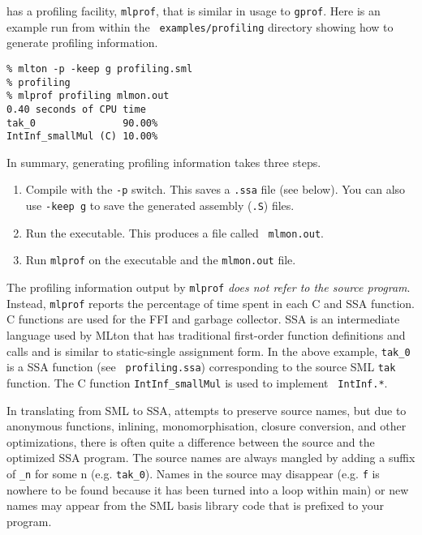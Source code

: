 
{\mlton} has a profiling facility, {\tt mlprof}, that is similar in
usage to {\tt gprof}.  Here is an example run from within the {\tt
  examples/profiling} directory showing how to generate profiling
information.

\begin{verbatim}
% mlton -p -keep g profiling.sml
% profiling
% mlprof profiling mlmon.out
0.40 seconds of CPU time
tak_0               90.00%
IntInf_smallMul (C) 10.00%
\end{verbatim}
In summary, generating profiling information takes three steps.
\begin{enumerate}
  
\item Compile with the {\tt -p} switch.  This saves a {\tt .ssa} file
  (see below).  You can also use {\tt -keep g} to save the generated
  assembly ({\tt .S}) files.
  
\item Run the executable.  This produces a file called {\tt
    mlmon.out}.
  
\item Run {\tt mlprof} on the executable and the {\tt mlmon.out} file.

\end{enumerate}
The profiling information output by {\tt mlprof} {\em does not refer
  to the source program}.  Instead, {\tt mlprof} reports the
percentage of time spent in each C and SSA function.  C functions are
used for the FFI and garbage collector.  SSA is an intermediate
language used by MLton that has traditional first-order function
definitions and calls and is similar to static-single assignment form.
In the above example, {\tt tak\_0} is a SSA function (see {\tt
  profiling.ssa}) corresponding to the source SML {\tt tak} function.
The C function {\tt IntInf\_smallMul} is used to implement {\tt
  IntInf.*}.

In translating from SML to SSA, {\mlton} attempts to preserve source
names, but due to anonymous functions, inlining, monomorphisation,
closure conversion, and other optimizations, there is often quite a
difference between the source and the optimized SSA program.  The
source names are always mangled by adding a suffix of {\tt \_n} for
some n (e.g. {\tt tak\_0}).  Names in the source may disappear (e.g.
{\tt f} is nowhere to be found because it has been turned into a loop
within main) or new names may appear from the SML basis library code
that is prefixed to your program.

